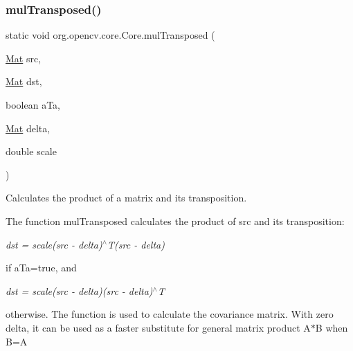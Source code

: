 \subsubsection{\texorpdfstring{mul\+Transposed()}{mulTransposed()}\hspace{0.1cm}{\footnotesize\ttfamily [2/3]}}
{\footnotesize\ttfamily static void org.\+opencv.\+core.\+Core.\+mul\+Transposed (\begin{DoxyParamCaption}\item[{\mbox{\hyperlink{classorg_1_1opencv_1_1core_1_1_mat}{Mat}}}]{src,  }\item[{\mbox{\hyperlink{classorg_1_1opencv_1_1core_1_1_mat}{Mat}}}]{dst,  }\item[{boolean}]{a\+Ta,  }\item[{\mbox{\hyperlink{classorg_1_1opencv_1_1core_1_1_mat}{Mat}}}]{delta,  }\item[{double}]{scale }\end{DoxyParamCaption})\hspace{0.3cm}{\ttfamily [static]}}

Calculates the product of a matrix and its transposition.

The function {\ttfamily mul\+Transposed} calculates the product of {\ttfamily src} and its transposition\+:

{\itshape dst = scale(src -\/ delta)$^\wedge$T(src -\/ delta)}

if {\ttfamily a\+Ta=true}, and

{\itshape dst = scale(src -\/ delta)(src -\/ delta)$^\wedge$T}

otherwise. The function is used to calculate the covariance matrix. With zero delta, it can be used as a faster substitute for general matrix product {\ttfamily A$\ast$B} when {\ttfamily B=A\textquotesingle{}}


